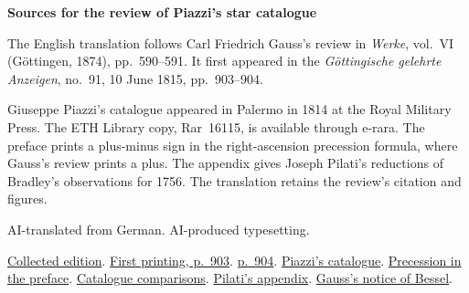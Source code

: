 \clearpage\thispagestyle{empty}
\begin{center}\Large\bfseries Sources for the review of Piazzi’s star catalogue\end{center}

The English translation follows Carl Friedrich Gauss’s review in \emph{Werke}, vol.~VI (Göttingen, 1874), pp.~590--591. It first appeared in the \emph{Göttingische gelehrte Anzeigen}, no.~91, 10 June 1815, pp.~903--904.

Giuseppe Piazzi’s catalogue appeared in Palermo in 1814 at the Royal Military Press. The ETH Library copy, Rar~16115, is available through e-rara. The preface prints a plus-minus sign in the right-ascension precession formula, where Gauss’s review prints a plus. The appendix gives Joseph Pilati’s reductions of Bradley’s observations for 1756. The translation retains the review’s citation and figures.

AI-translated from German. AI-produced typesetting.

\href{https://gdz.sub.uni-goettingen.de/id/PPN236007467}{Collected edition}. \href{https://images.p.sub.uni-goettingen.de/iiif/image/gdz:PPN319721507_1815:00000909/full/1650,/0/default.jpg}{First printing, p.~903}. \href{https://images.p.sub.uni-goettingen.de/iiif/image/gdz:PPN319721507_1815:00000910/full/1650,/0/default.jpg}{p.~904}. \href{https://doi.org/10.3931/e-rara-49143}{Piazzi’s catalogue}. \href{https://www.e-rara.ch/zut/content/zoom/13476308}{Precession in the preface}. \href{https://www.e-rara.ch/zut/content/zoom/13476311}{Catalogue comparisons}. \href{https://www.e-rara.ch/zut/content/zoom/13476490}{Pilati’s appendix}. \href{https://images.p.sub.uni-goettingen.de/iiif/image/gdz:PPN319721507_1814:00000190/full/1650,/0/default.jpg}{Gauss’s notice of Bessel}.

\clearpage
